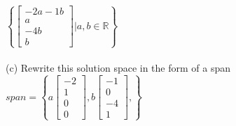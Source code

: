 \documentclass{article}
\begin{document}
$\left\{ \left[ 
\begin{matrix} -2a - 1b \\ a \\ -4b \\ b  \end{matrix} 
\right] \Bigg|  a,b \in \mathbb{R} \right\}$\\
\\
(c) Rewrite this solution space in the form of a span
$span = \left\{ 
a \left[\begin{matrix} -2 \\ 1 \\ 0 \\ 0  \end{matrix} \right],
b \left[\begin{matrix} -1 \\ 0 \\ -4 \\ 1  \end{matrix} \right],
\right\}$\\
\\
\end{document}
